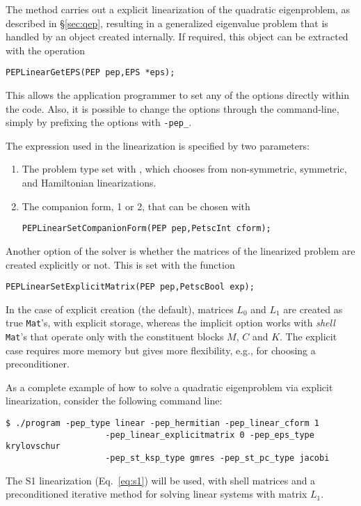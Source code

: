 The  method carries out a explicit linearization of the quadratic eigenproblem, as described in \S\ref{sec:qep}, resulting in a generalized eigenvalue problem that is handled by an  object created internally. If required, this  object can be extracted with the operation
	\begin{Verbatim}[fontsize=\small]
	PEPLinearGetEPS(PEP pep,EPS *eps);
	\end{Verbatim}
This allows the application programmer to set any of the  options directly within the code. Also, it is possible to change the  options through the command-line, simply by prefixing the  options with \texttt{-pep\_}.

The expression used in the linearization is specified by two parameters:
\begin{enumerate}
\item The problem type set with , which chooses from non-symmetric, symmetric, and Hamiltonian linearizations.
\item The companion form, 1 or 2, that can be chosen with
	\begin{Verbatim}[fontsize=\small]
   PEPLinearSetCompanionForm(PEP pep,PetscInt cform);
	\end{Verbatim}
\end{enumerate}

Another option of the  solver is whether the matrices of the linearized problem are created explicitly or not. This is set with the function
	\begin{Verbatim}[fontsize=\small]
	PEPLinearSetExplicitMatrix(PEP pep,PetscBool exp);
	\end{Verbatim}
In the case of explicit creation (the default), matrices $L_0$ and $L_1$ are created as true \texttt{Mat}'s, with explicit storage, whereas the implicit option works with \emph{shell} \texttt{Mat}'s that operate only with the constituent blocks $M$, $C$ and $K$. The explicit case requires more memory but gives more flexibility, e.g., for choosing a preconditioner.

As a complete example of how to solve a quadratic eigenproblem via explicit linearization, consider the following command line:
\begin{Verbatim}[fontsize=\small]
	$ ./program -pep_type linear -pep_hermitian -pep_linear_cform 1
                    -pep_linear_explicitmatrix 0 -pep_eps_type krylovschur
                    -pep_st_ksp_type gmres -pep_st_pc_type jacobi
\end{Verbatim}
The S1 linearization (Eq.\ \ref{eq:s1}) will be used, with shell matrices and a preconditioned iterative method for solving linear systems with matrix $L_1$.

